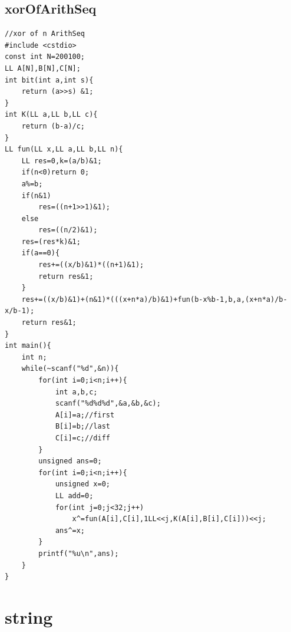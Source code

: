 \documentclass[10pt,twocolumn,oneside]{article}
\begin{document}
\subsection{xorOfArithSeq}
\begin{lstlisting}
//xor of n ArithSeq
#include <cstdio>
const int N=200100;
LL A[N],B[N],C[N];
int bit(int a,int s){
	return (a>>s) &1;
}
int K(LL a,LL b,LL c){
	return (b-a)/c;
}
LL fun(LL x,LL a,LL b,LL n){
	LL res=0,k=(a/b)&1;
	if(n<0)return 0;
	a%=b;
	if(n&1)
		res=((n+1>>1)&1);
	else
		res=((n/2)&1);
	res=(res*k)&1;
	if(a==0){
		res+=((x/b)&1)*((n+1)&1);
        return res&1;
	}
	res+=((x/b)&1)+(n&1)*(((x+n*a)/b)&1)+fun(b-x%b-1,b,a,(x+n*a)/b-x/b-1);
	return res&1;
}
int main(){
	int n;
	while(~scanf("%d",&n)){
		for(int i=0;i<n;i++){
			int a,b,c;
			scanf("%d%d%d",&a,&b,&c);
			A[i]=a;//first
			B[i]=b;//last
			C[i]=c;//diff
		}
		unsigned ans=0;
		for(int i=0;i<n;i++){
			unsigned x=0;
			LL add=0;
			for(int j=0;j<32;j++)
				x^=fun(A[i],C[i],1LL<<j,K(A[i],B[i],C[i]))<<j;
			ans^=x;
		}
		printf("%u\n",ans);
	}
}

\end{lstlisting}
\section{string}
\end{document}

